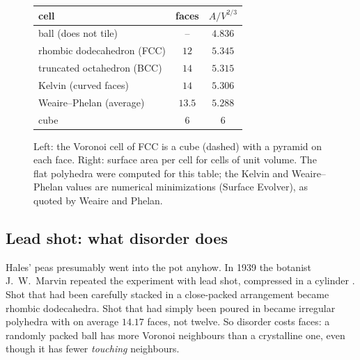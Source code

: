 \begin{figure}[ht]
\centering
\begin{minipage}{0.47\textwidth}
\centering
{}
\end{minipage}\hfill
\begin{minipage}{0.5\textwidth}
\centering\small
\renewcommand{\arraystretch}{1.15}
\begin{tabular}{lcc}
\toprule
cell & faces & $A/V^{2/3}$\\
\midrule
ball (does not tile) & -- & $4.836$\\
rhombic dodecahedron (FCC) & $12$ & $5.345$\\
truncated octahedron (BCC) & $14$ & $5.315$\\
Kelvin (curved faces) & $14$ & $5.306$\\
Weaire--Phelan (average) & $13.5$ & $5.288$\\
cube & $6$ & $6$\\
\bottomrule
\end{tabular}
\end{minipage}
\caption{Left: the Voronoi cell of FCC is a cube (dashed) with a pyramid on each face. Right: surface area
per cell for cells of unit volume. The flat polyhedra were computed for this table; the Kelvin and
Weaire--Phelan values are numerical minimizations (Surface Evolver), as quoted by Weaire and
Phelan.}
\label{PHYS:fig:rd}
\end{figure}

\subsection*{Lead shot: what disorder does}
Hales' peas presumably went into the pot anyhow. In 1939 the botanist J.~W.~Marvin repeated the experiment with
lead shot, compressed in a cylinder . Shot that had been carefully stacked in a
close-packed arrangement became rhombic dodecahedra. Shot that had simply been poured in became
irregular polyhedra with on average $14.17$ faces, not twelve. So disorder costs faces: a randomly packed ball has
more Voronoi neighbours than a crystalline one, even though it has fewer \emph{touching} neighbours.

